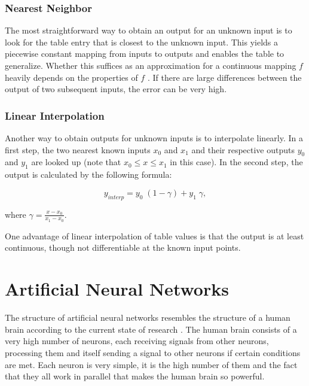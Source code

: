 \subsubsection{Nearest Neighbor}

The most straightforward way to obtain an output for an unknown input is to look for the table entry that is closest to the unknown input. This yields a piecewise constant mapping from inputs to outputs and enables the table to generalize. Whether this suffices as an approximation for a continuous mapping $f$ heavily depends on the properties of $f$ . If there are large differences between the output of two subsequent inputs, the error can be very high.

\subsubsection{Linear Interpolation}

Another way to obtain outputs for unknown inputs is to interpolate linearly. In a first step, the two nearest known inputs $x_0$ and $x_1$ and their respective outputs $y_0$ and $y_1$ are looked up (note that $x_0 \leq x \leq x_1$ in this case). In the second step, the output is calculated by the following formula:

\begin{equation}
y_{interp} = y_0 \; (1-\gamma) + y_1 \; \gamma,
\end{equation}

where $\gamma = \frac{x - x_0}{x_1 - x_0}$.

One advantage of linear interpolation of table values is that the output is at least continuous, though not differentiable at the known input points.

\section{Artificial Neural Networks}

The structure of artificial neural networks resembles the structure of a human brain according to the current state of research \cite[Chapter~1.1]{Kriesel2007NeuralNetworks}. The human brain consists of a very high number of neurons, each receiving signals from other neurons, processing them and itself sending a signal to other neurons if certain conditions are met. Each neuron is very simple, it is the high number of them and the fact that they all work in parallel that makes the human brain so powerful. 

